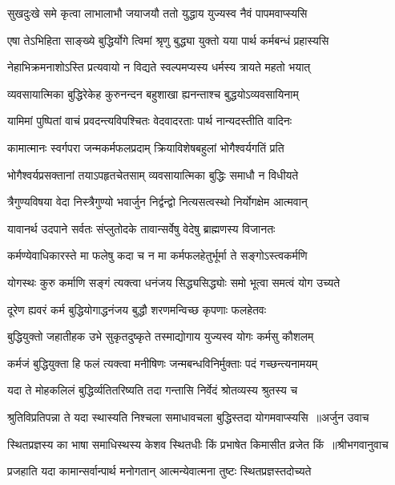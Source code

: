 \twolineshloka
{सुखदुःखे समे कृत्वा लाभालाभौ जयाजयौ}
{ततो युद्धाय युज्यस्व नैवं पापमवाप्स्यसि}


\twolineshloka
{एषा तेऽभिहिता साङ्ख्ये बुद्धिर्योगे त्विमां श्रृणु}
{बुद्ध्या युक्तो यया पार्थ कर्मबन्धं प्रहास्यसि}


\twolineshloka
{नेहाभिक्रमनाशोऽस्ति प्रत्यवायो न विद्यते}
{स्वल्पमप्यस्य धर्मस्य त्रायते महतो भयात्}


\twolineshloka
{व्यवसायात्मिका बुद्धिरेकेह कुरुनन्दन}
{बहुशाखा ह्यनन्ताश्च बुद्धयोऽव्यवसायिनाम्}


\twolineshloka
{यामिमां पुष्पितां वाचं प्रवदन्त्यविपश्चितः}
{वेदवादरताः पार्थ नान्यदस्तीति वादिनः}


\twolineshloka
{कामात्मानः स्वर्गपरा जन्मकर्मफलप्रदाम्}
{क्रियाविशेषबहुलां भोगैश्वर्यगतिं प्रति}


\twolineshloka
{भोगैश्वर्यप्रसक्तानां तयाऽपहृतचेतसाम्}
{व्यवसायात्मिका बुद्धिः समाधौ न विधीयते}


\twolineshloka
{त्रैगुण्यविषया वेदा निस्त्रैगुण्यो भवार्जुन}
{निर्द्वन्द्वो नित्यसत्वस्थो निर्योगक्षेम आत्मवान्}


\twolineshloka
{यावानर्थ उदपाने सर्वतः संप्लुतोदके}
{तावान्सर्वेषु वेदेषु ब्राह्मणस्य विजानतः}


\twolineshloka
{कर्मण्येवाधिकारस्ते मा फलेषु कदा च न}
{मा कर्मफलहेतुर्भूर्मा ते सङ्गोऽस्त्वकर्मणि}


\twolineshloka
{योगस्थः कुरु कर्माणि सङ्गं त्यक्त्वा धनंजय}
{सिद्ध्यसिद्ध्योः समो भूत्वा समत्वं योग उच्यते}


\twolineshloka
{दूरेण ह्यवरं कर्म बुद्धियोगाद्धनंजय}
{बुद्धौ शरणमन्विच्छ कृपणाः फलहेतवः}


\twolineshloka
{बुद्धियुक्तो जहातीहक उभे सुकृतदुष्कृते}
{तस्माद्योगाय युज्यस्व योगः कर्मसु कौशलम्}


\twolineshloka
{कर्मजं बुद्धियुक्ता हि फलं त्यक्त्वा मनीषिणः}
{जन्मबन्धविनिर्मुक्ताः पदं गच्छन्त्यनामयम्}


\twolineshloka
{यदा ते मोहकलिलं बुद्धिर्व्यतितरिष्यति}
{तदा गन्तासि निर्वेदं श्रोतव्यस्य श्रुतस्य च}


\threelineshloka
{श्रुतिविप्रतिपन्ना ते यदा स्थास्यति निश्चला}
{समाधावचला बुद्धिस्तदा योगमवाप्स्यसि ॥अर्जुन उवाच}
{}


\threelineshloka
{स्थितप्रज्ञस्य का भाषा समाधिस्थस्य केशव}
{स्थितधीः किं प्रभाषेत किमासीत व्रजेत किं ॥श्रीभगवानुवाच}
{}


\twolineshloka
{प्रजहाति यदा कामान्सर्वान्पार्थ मनोगतान्}
{आत्मन्येवात्मना तुष्टः स्थितप्रज्ञस्तदोच्यते}


